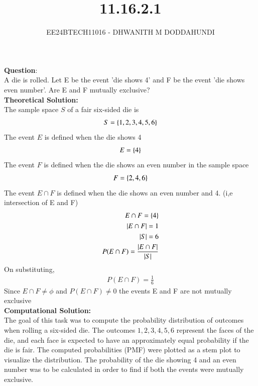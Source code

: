\documentclass[journal]{IEEEtran}
\begin{document}

\vspace{3cm}

\title{11.16.2.1}
\author{EE24BTECH11016 - DHWANITH M DODDAHUNDI}
 \maketitle
{\let\newpage\relax\maketitle}

\renewcommand{\thefigure}{\theenumi}
\renewcommand{\thetable}{\theenumi}
\setlength{\intextsep}{10pt} %


\renewcommand{\thetable}{\theenumi}
\textbf{Question}:\\
A die is rolled. Let E be the event 'die shows 4' and F be the event 'die shows
even number'. Are E and F mutually exclusive? \\
\textbf{Theoretical Solution: }\\
The sample space $S$ of a fair six-sided die is
\begin{align}
    S = \left\{1,2,3,4,5,6\right\}
\end{align}
The event $E$ is defined when the die shows 4 
\begin{align}
    E=\left\{4\right\}
\end{align}
The event $F$ is defined when the die shows an even number in the sample space
\begin{align}
    F = \left\{2,4,6\right\}
\end{align} 
The event $E \cap F$ is defined when the die shows an even number and 4. (i,e intersection of E and F)
\begin{align}
    E \cap F =\left\{4\right\} \\
   |E \cap F| =1 \\
    |S| = 6 \\
   P(E \cap F) = \frac{|E \cap F|}{|S|} \\
\end{align}
On substituting, 
\begin{align}
    P(E \cap F) = \frac{1}{6}
\end{align}
Since $E \cap F \neq \phi$ and $P(E \cap F) \neq 0$ the events E and F are not mutually exclusive \\
\textbf{Computational Solution: }\\
The goal of this task was to compute the probability distribution of outcomes when rolling a six-sided die. The outcomes \(1, 2, 3, 4, 5, 6\) represent the faces of the die, and each face is expected to have an approximately equal probability if the die is fair. The computed probabilities (PMF) were plotted as a stem plot to visualize the distribution. The probability of the die showing 4 and an even number was to be calculated in order to find if both the events were mutually exclusive.
\end{document}
